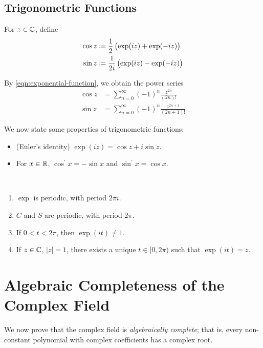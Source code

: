 \subsection{Trigonometric Functions}
\begin{definition}
For $z\in\mathbb C$, define
\begin{equation}\label{eqn:trigonometric-functions}
\begin{split}
\cos z&\coloneqq\frac{1}{2}\left(\exp(iz)+\exp(-iz)\right)\\
\sin z&\coloneqq\frac{1}{2i}\left(\exp(iz)-\exp(-iz)\right)
\end{split}
\end{equation}
\end{definition}

By \cref{eqn:exponential-function}, we obtain the power series
\begin{align*}
\cos z&=\sum_{n=0}^{\infty}(-1)^n\frac{z^{2n}}{(2n)!}\\
\sin z&=\sum_{n=0}^{\infty}(-1)^n\frac{z^{2n+1}}{(2n+1)!}
\end{align*}

We now state some properties of trigonometric functions:
\begin{itemize}
\item (Euler's identity) $\exp(iz)=\cos z+i\sin z$.
\item For $x\in\mathbb R$, $\cos^\prime x=-\sin x$ and $\sin^\prime x=\cos x$.
\end{itemize}

\begin{proposition} \
\begin{enumerate}[label=(\roman*)]
\item $\exp$ is periodic, with period $2\pi i$.
\item $C$ and $S$ are periodic, with period $2\pi$.
\item If $0<t<2\pi$, then $\exp(it)\neq1$.
\item If $z\in\mathbb C$, $|z|=1$, there exists a unique $t\in[0,2\pi)$ such that $\exp(it)=z$.
\end{enumerate}
\end{proposition}
\pagebreak

\section{Algebraic Completeness of the Complex Field}
We now prove that the complex field is \emph{algebraically complete}; that is, every non-constant polynomial with complex coefficients has a complex root.

